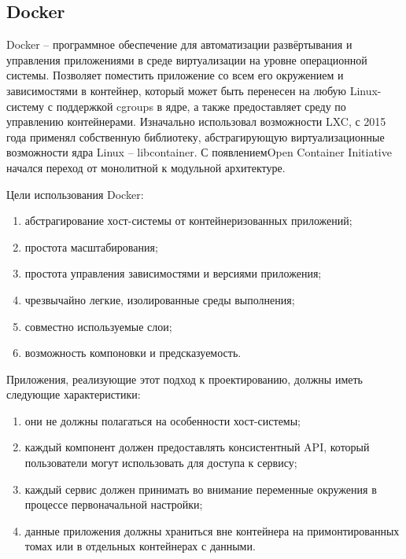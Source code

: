 \subsection{Docker}
\label{sec:development:docker}

Docker -- программное обеспечение для автоматизации развёртывания и управления приложениями в среде виртуализации на уровне операционной системы. Позволяет поместить приложение со всем его окружением и зависимостями в контейнер, который может быть перенесен на любую Linux-систему с поддержкой cgroups в ядре, а также предоставляет среду по управлению контейнерами. Изначально использовал возможности LXC, с 2015 года применял собственную библиотеку, абстрагирующую виртуализационные возможности ядра Linux -- libcontainer. С появлением ​Open Container \linebreak Initiative начался переход от монолитной к модульной архитектуре.

Цели использования Docker:
\begin{enumerate}
  \item абстрагирование хост-системы от контейнеризованных \linebreak при\-ло\-же\-ний;
  \item простота масштабирования;
  \item простота управления зависимостями и версиями приложения;
  \item чрезвычайно легкие, изолированные среды выполнения;
  \item совместно используемые слои;
  \item возможность компоновки и предсказуемость.
\end{enumerate}

Приложения, реализующие этот подход к проектированию, должны \linebreak иметь следующие характеристики:
\begin{enumerate}
  \item они не должны полагаться на особенности хост-системы;
  \item каждый компонент должен предоставлять консистентный API, который пользователи могут использовать для доступа к сервису;
  \item каждый сервис должен принимать во внимание переменные окружения в процессе первоначальной настройки;
  \item данные приложения должны храниться вне контейнера на примонтированных томах или в отдельных контейнерах с данными.
\end{enumerate}

